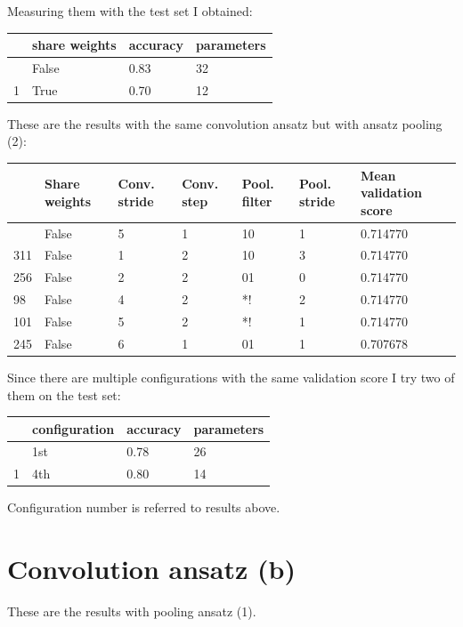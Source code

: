 \documentclass[
  13pt,
  a4paper,
  DIV=11,
  numbers=noendperiod]{scrreprt}
\begin{document}
Measuring them with the test set I obtained:

\begin{longtable}[]{@{}llll@{}}
\toprule\noalign{}
& share weights & accuracy & parameters \\
\midrule\noalign{}
\endhead
\bottomrule\noalign{}
\endlastfoot
0 & False & 0.83 & 32 \\
1 & True & 0.70 & 12 \\
\end{longtable}

These are the results with the same convolution ansatz but with ansatz
pooling (2):

\begin{longtable}[]{@{}lllllll@{}}
\toprule\noalign{}
& Share weights & Conv. stride & Conv. step & Pool. filter & Pool.
stride & Mean validation score \\
\midrule\noalign{}
\endhead
\bottomrule\noalign{}
\endlastfoot
297 & False & 5 & 1 & 10 & 1 & 0.714770 \\
311 & False & 1 & 2 & 10 & 3 & 0.714770 \\
256 & False & 2 & 2 & 01 & 0 & 0.714770 \\
98 & False & 4 & 2 & *! & 2 & 0.714770 \\
101 & False & 5 & 2 & *! & 1 & 0.714770 \\
245 & False & 6 & 1 & 01 & 1 & 0.707678 \\
\end{longtable}

Since there are multiple configurations with the same validation score I
try two of them on the test set:

\begin{longtable}[]{@{}llll@{}}
\toprule\noalign{}
& configuration & accuracy & parameters \\
\midrule\noalign{}
\endhead
\bottomrule\noalign{}
\endlastfoot
0 & 1st & 0.78 & 26 \\
1 & 4th & 0.80 & 14 \\
\end{longtable}

Configuration number is referred to results above.

\section{Convolution ansatz (b)}\label{convolution-ansatz-b}

These are the results with pooling ansatz (1).
\end{document}
